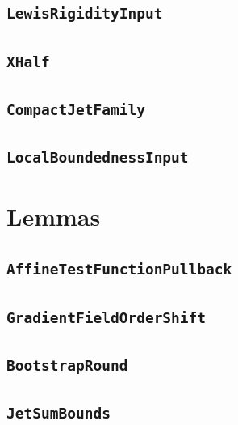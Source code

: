 \documentclass[11pt]{amsart}
\theoremstyle{definition}
\begin{document}
\subsection{\texorpdfstring{\texttt{LewisRigidityInput}}{LewisRigidityInput}}\label{node:LewisRigidityInput}


\subsection{\texorpdfstring{\texttt{XHalf}}{XHalf}}\label{node:XHalf}


\subsection{\texorpdfstring{\texttt{CompactJetFamily}}{CompactJetFamily}}\label{node:CompactJetFamily}


\subsection{\texorpdfstring{\texttt{LocalBoundednessInput}}{LocalBoundednessInput}}\label{node:LocalBoundednessInput}


\section{Lemmas}
\subsection{\texorpdfstring{\texttt{AffineTestFunctionPullback}}{AffineTestFunctionPullback}}\label{node:AffineTestFunctionPullback}


\subsection{\texorpdfstring{\texttt{GradientFieldOrderShift}}{GradientFieldOrderShift}}\label{node:GradientFieldOrderShift}


\subsection{\texorpdfstring{\texttt{BootstrapRound}}{BootstrapRound}}\label{node:BootstrapRound}


\subsection{\texorpdfstring{\texttt{JetSumBounds}}{JetSumBounds}}\label{node:JetSumBounds}

\end{document}
